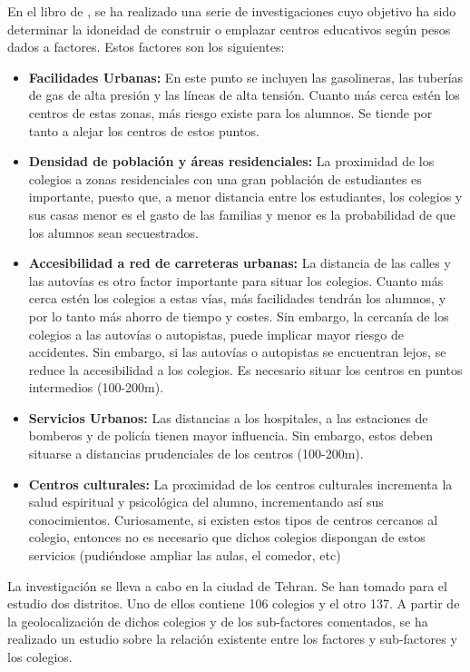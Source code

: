 En el libro de , se ha realizado una serie de investigaciones cuyo objetivo ha sido determinar la idoneidad de construir o emplazar centros educativos según pesos dados a factores. Estos factores son los siguientes:

\begin{itemize}
	\item \textbf{Facilidades Urbanas:} En este punto se incluyen las gasolineras, las tuberías de gas de alta presión y las líneas de alta tensión. Cuanto más cerca estén los centros de estas zonas, más riesgo existe para los alumnos. Se tiende por tanto a alejar los centros de estos puntos.
	\item \textbf{Densidad de población y áreas residenciales:} La proximidad de los colegios a zonas residenciales con una gran población de estudiantes es importante, puesto que, a menor distancia entre los estudiantes, los colegios y sus casas menor es el gasto de las familias y menor es la probabilidad de que los alumnos sean secuestrados.
	\item\textbf{ Accesibilidad a red de carreteras urbanas:} La distancia de las calles y las autovías es otro factor importante para situar los colegios. Cuanto más cerca estén los colegios a estas vías, más facilidades tendrán los alumnos, y por lo tanto más ahorro de tiempo y costes.
	Sin embargo, la cercanía de los colegios a las autovías o autopistas, puede implicar mayor riesgo de accidentes. Sin embargo, si las autovías o autopistas se encuentran lejos, se reduce la accesibilidad a los colegios. Es necesario situar los centros en puntos intermedios (100-200m).
	\item \textbf{Servicios Urbanos:} Las distancias a los hospitales, a las estaciones de bomberos y de policía tienen mayor influencia. Sin embargo, estos deben situarse a distancias prudenciales de los centros (100-200m).
	\item \textbf{Centros culturales:} La proximidad de los centros culturales incrementa la salud espiritual y psicológica del alumno, incrementando así sus conocimientos. Curiosamente, si existen estos tipos de centros cercanos al colegio, entonces no es necesario que dichos colegios dispongan de estos servicios (pudiéndose ampliar las aulas, el comedor, etc)
\end{itemize}                     

La investigación se lleva a cabo en la ciudad de Tehran. Se han tomado para el estudio dos distritos. Uno de ellos contiene 106 colegios y el otro 137. A partir de la geolocalización de dichos colegios y de los sub-factores comentados, se ha realizado un estudio sobre la relación existente entre los factores y sub-factores y los colegios.

